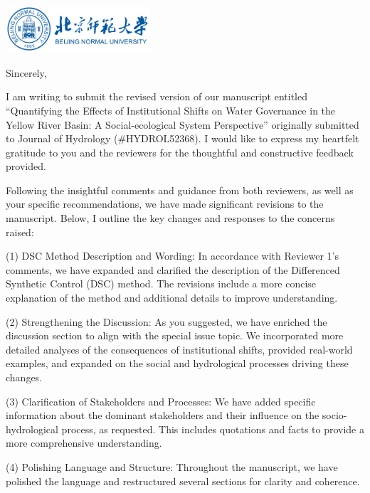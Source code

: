 \documentclass[11pt,a4paper,roman]{moderncv}
\begin{document}
\begin{minipage}[t]{\textwidth}
\includegraphics[width=0.40\textwidth]{bnu}
\end{minipage}


\opening{\vspace*{-2em}}
\closing{Sincerely,}{\vspace*{-2em}}
\makelettertitle
\justify

I am writing to submit the revised version of our manuscript entitled ``Quantifying the Effects of Institutional Shifts on Water Governance in the Yellow River Basin: A Social-ecological System Perspective'' originally submitted to Journal of Hydrology (\#HYDROL52368). I would like to express my heartfelt gratitude to you and the reviewers for the thoughtful and constructive feedback provided.

Following the insightful comments and guidance from both reviewers, as well as your specific recommendations, we have made significant revisions to the manuscript. Below, I outline the key changes and responses to the concerns raised:

(1) DSC Method Description and Wording: In accordance with Reviewer 1's comments, we have expanded and clarified the description of the Differenced Synthetic Control (DSC) method. The revisions include a more concise explanation of the method and additional details to improve understanding.

(2) Strengthening the Discussion: As you suggested, we have enriched the discussion section to align with the special issue topic. We incorporated more detailed analyses of the consequences of institutional shifts, provided real-world examples, and expanded on the social and hydrological processes driving these changes.

(3) Clarification of Stakeholders and Processes: We have added specific information about the dominant stakeholders and their influence on the socio-hydrological process, as requested. This includes quotations and facts to provide a more comprehensive understanding.

(4) Polishing Language and Structure: Throughout the manuscript, we have polished the language and restructured several sections for clarity and coherence.
\end{document}
